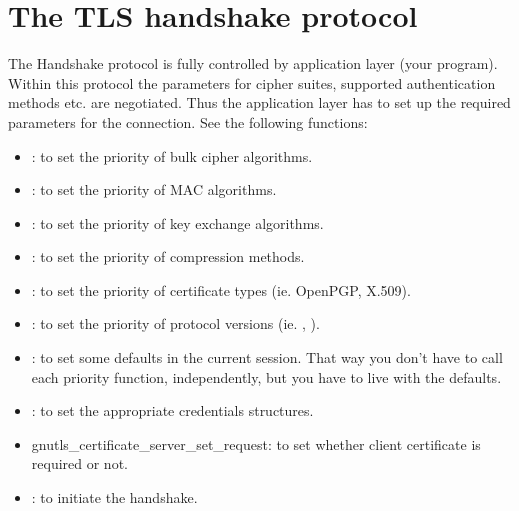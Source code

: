 \section{The TLS handshake protocol}
\label{handshake}

The Handshake protocol is fully controlled by application layer (your 
program). Within this protocol the parameters for cipher suites, supported
authentication methods etc. are negotiated. Thus the application layer
has to set up the required parameters for the connection.
See the following functions:
\begin{itemize}
\item {}:
to set the priority of bulk cipher algorithms.
\item {}:
to set the priority of MAC algorithms.
\item {}:
to set the priority of key exchange algorithms.
\item {}:
to set the priority of compression methods.
\item {}:
to set the priority of certificate types (ie. OpenPGP, X.509).
\item {}:
to set the priority of protocol versions (ie. \sslIII{}, \tlsI).
\item {}:
to set some defaults in the current session. That way you don't have to call each
priority function, independently, but you have to live with the defaults.

\item {}: to set the
appropriate credentials structures.
\item {}
{gnutls\_certificate\_server\_set\_request}: to set
whether client certificate is required or not.
\item {}: to initiate the
handshake.
\end{itemize}



